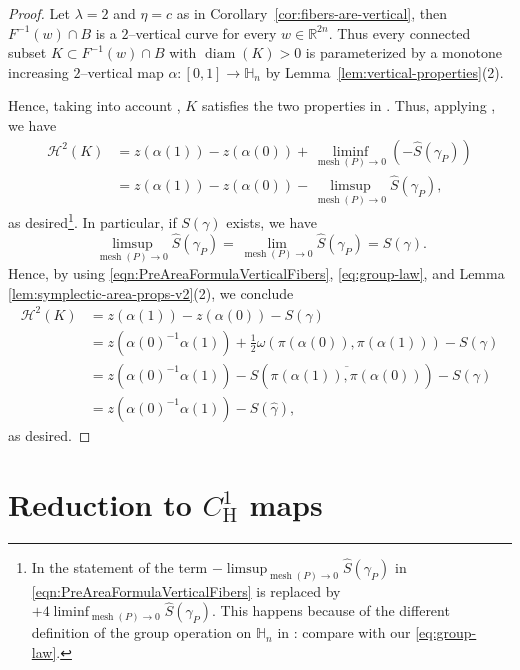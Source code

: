 \documentclass[12pt,reqno]{amsart}
\newcommand{\cH}{\mathcal{H}}
\DeclareMathOperator{\mesh}{mesh}
\newcommand{\HH}{\mathbb{H}}
\newcommand{\from}{\colon}
\theoremstyle{remark}
\newcommand{\0}{\mathbf{0}}
\renewcommand{\1}{\mathbf 1}
\DeclareMathOperator{\diam}{diam}
\begin{document}
\begin{proof}
    Let $\lambda=2$ and $\eta=c$ as in Corollary~\ref{cor:fibers-are-vertical}, then $F^{-1}(w)\cap B$ is a $2$--vertical curve for every $w\in\mathbb R^{2n}$. Thus every connected subset $K\subset F^{-1}(w)\cap B$ with $\diam(K)>0$ is parameterized by a monotone increasing $2$--vertical map $\alpha\from [0,1]\to\HH_n$ by Lemma~\ref{lem:vertical-properties}(2).

    Hence, taking into account \cite[Remark 5.3.9]{Kozhevnikov}, $K$ satisfies the two properties in \cite[Notation 5.3.8]{Kozhevnikov}. Thus, applying \cite[Corollary 5.4.16 and Remark 5.4.19]{Kozhevnikov}, we have
    \[
    \begin{aligned}
    \cH^2(K)&=z(\alpha(1))-z(\alpha(0))+\liminf_{\mesh(P)\to 0}(-\hat S(\gamma_P)) \\
    &=z(\alpha(1))-z(\alpha(0))-\limsup_{\mesh(P)\to 0}\hat S(\gamma_P),
    \end{aligned}
    \]
    as desired\footnote{In the statement of \cite[Corollary 5.4.16]{Kozhevnikov} the term $-\limsup_{\mesh(P)\to 0}\hat S(\gamma_P)$ in \eqref{eqn:PreAreaFormulaVerticalFibers} is replaced by $+4\liminf_{\mesh(P)\to 0}\hat S(\gamma_P)$. This happens because of the different definition of the group operation on $\HH_n$ in \cite{Kozhevnikov}: compare \cite[Pages 19-20]{Kozhevnikov} with our \eqref{eq:group-law}.}. In particular, if $S(\gamma)$ exists, we have 
    \[
    \limsup_{\mesh(P)\to 0} \hat S(\gamma_P) = \lim_{\mesh(P)\to 0} \hat S(\gamma_P) = S(\gamma).
    \]
    Hence, by using \eqref{eqn:PreAreaFormulaVerticalFibers}, \eqref{eq:group-law}, and Lemma \ref{lem:symplectic-area-props-v2}(2),  we conclude
    \[
    \begin{aligned}
        \cH^2(K) &= z(\alpha(1))-z(\alpha(0))-S(\gamma) \\
        & = z(\alpha(0)^{-1}\alpha(1))+\frac{1}{2}\omega(\pi(\alpha(0)),\pi(\alpha(1)))-S(\gamma)\\
        &=z(\alpha(0)^{-1}\alpha(1))-S(\overline{\pi(\alpha(1)), \pi(\alpha(0))})-S(\gamma)\\
        &=z(\alpha(0)^{-1}\alpha(1))-S(\hat\gamma),
    \end{aligned}
    \]
    as desired.
\end{proof}


\section{Reduction to \texorpdfstring{$C^1_{\mathrm{H}}$}{C\^{}1\_{}H} maps}\label{sec:ReductionToC1H}
\end{document}

